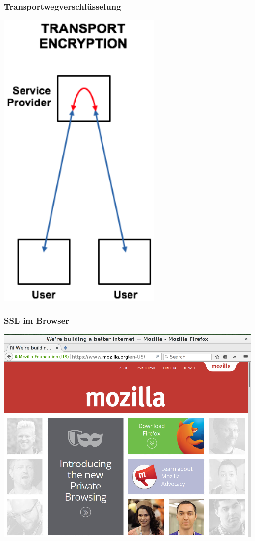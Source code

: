 \begin{frame}
    \frametitle{Transportwegverschlüsselung}
    \begin{center}
      \includegraphics[height=0.8\textheight]{../../img/enc-transport.png}
    \end{center}
\end{frame}

\begin{frame}
    \frametitle{SSL im Browser}
    \begin{center}
      \includegraphics[height=0.7\textheight]{../../img/ssl_special.png}
    \end{center}
\end{frame}

